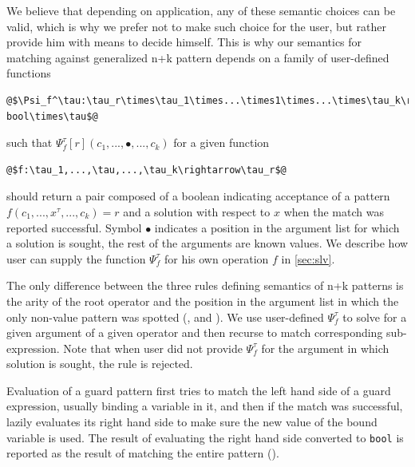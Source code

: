 \documentclass[preprint]{sigplanconf}
\makeatletter
\DeclareRobustCommand{\code}[1]{{\lstinline[breaklines=false,escapechar=@]{#1}}}
\makeatother
\begin{document}
\noindent
We believe that depending on application, any of these semantic choices can be 
valid, which is why we prefer not to make such choice for the user, but rather 
provide him with means to decide himself. This is why our semantics for matching 
against generalized n+k pattern depends on a family of user-defined functions 

\begin{lstlisting}
@$\Psi_f^\tau:\tau_r\times\tau_1\times...\times1\times...\times\tau_k\rightarrow bool\times\tau$@
\end{lstlisting} 

\noindent
such that $\Psi_f^\tau[r](c_1,...,\bullet,...,c_k)$ for a given function 

\begin{lstlisting}
@$f:\tau_1,...,\tau,...,\tau_k\rightarrow\tau_r$@
\end{lstlisting} 

\noindent should return a pair composed of a boolean indicating acceptance of a 
pattern $f(c_1,...,x^\tau,...,c_k)=r$ and a solution with respect to $x$ 
when the match was reported successful. Symbol $\bullet$ indicates a position in 
the argument list for which a solution is sought, the rest of the arguments are 
known values. We describe how user can supply the function $\Psi_f^\tau$ for his 
own operation $f$ in \textsection\ref{sec:slv}.

The only difference between the three rules defining semantics of n+k patterns 
is the arity of the root operator and the position in the argument list in which 
the only non-value pattern was spotted (, 
 and ). We use user-defined 
$\Psi_f^\tau$ to solve for a given argument of a given operator and then recurse 
to match corresponding sub-expression. Note that when user did not provide 
$\Psi_f^\tau$ for the argument in which solution is sought, the rule is 
rejected.

Evaluation of a guard pattern first tries to match the left hand side of a guard 
expression, usually binding a variable in it, and then if the match was 
successful, lazily evaluates its right hand side to make sure the new value of 
the bound variable is used. The result of evaluating the right hand side 
converted to \code{bool} is reported as the result of matching the entire 
pattern ().
\end{document}
